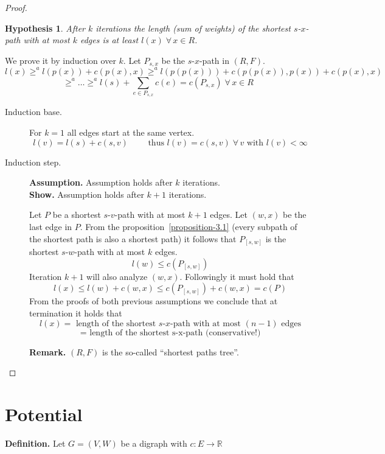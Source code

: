 \documentclass{article}
\newtheorem*{hypothesis}{Hypothesis}
\newcommand{\gath}[2]{$#1$-$#2$-path} %
\newcommand{\fall}{\;\forall\,}
\begin{document}
\begin{proof}
  \begin{hypothesis} %
    After $k$ iterations the length (sum of weights) of the shortest \gath sx with at most $k$ edges is at least $l(x) \fall x \in R$.
  \end{hypothesis}

  We prove it by induction over $k$. Let $P_{s,x}$ be the \gath sx in $(R, F)$.
  \[
    l(x) \geq^a l(p(x)) + c(p(x), x) \geq^a l(p(p(x))) + c(p(p(x)), p(x)) + c(p(x), x)
  \] \[
    \geq^a \ldots \geq^a l(s) + \sum_{e \in P_{s,x}} c(e) = c(P_{s,x}) \fall x \in R
  \]

  \begin{description}
    \item[Induction base.]
      For $k=1$ all edges start at the same vertex. \\
      \[
        l(v) = l(s) + c(s, v) \qquad \text{ thus } l(v) = c(s, v) \fall v \text{ with } l(v) < \infty
      \]

    \item[Induction step.]
    \textbf{Assumption.}
      Assumption holds after $k$ iterations. \\
    \textbf{Show.}
      Assumption holds after $k+1$ iterations.

    Let $P$ be a shortest \gath sv with at most $k+1$ edges. Let $(w, x)$ be the last edge in $P$. From the proposition~\ref{proposition-3.1} (every subpath of the shortest path is also a shortest path) it follows that $P_{[s,w]}$ is the shortest \gath sw with at most $k$ edges.
    \[
      l(w) \leq c(P_{[s,w]})
    \]
    Iteration $k+1$ will also analyze $(w, x)$. Followingly it must hold that
    \[
      l(x) \leq l(w) + c(w, x) \leq c(P_{[s,w]}) + c(w, x) = c(P)
    \]
    From the proofs of both previous assumptions we conclude that at termination it holds that
    \[
      l(x) = \text{ length of the shortest \gath sx with at most } (n-1) \text{ edges}
    \] \[
      = \text{ length of the shortest s-x-path (conservative!)}
    \]

    \textbf{Remark.}
      $(R, F)$ is the so-called ``shortest paths tree''.
  \end{description}
\end{proof}

\section{Potential}

\textbf{Definition.} Let $G = (V, W)$ be a digraph with $c: E \rightarrow \mathbb{R}$
\end{document}
